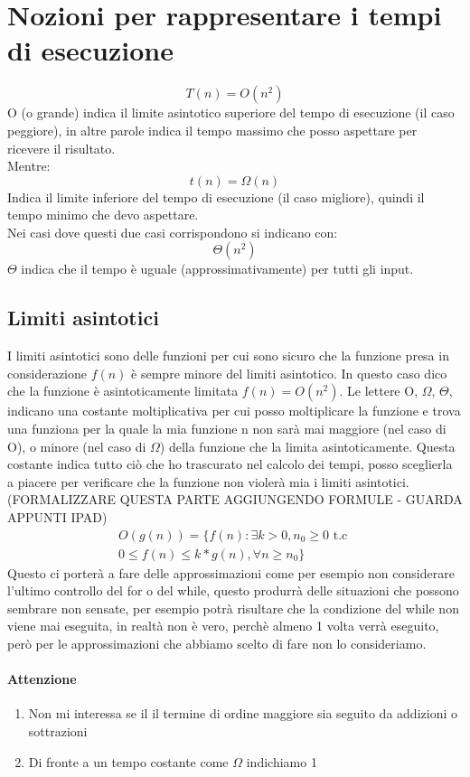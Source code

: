 \section{Nozioni per rappresentare i tempi di esecuzione}
\begin{equation*}
    T(n) = O(n^2)
\end{equation*}
O (o grande) indica il limite asintotico superiore del tempo di esecuzione (il caso peggiore),
in altre parole indica il tempo massimo che posso aspettare per ricevere il risultato.\\
Mentre:
\begin{equation*}
    t(n) = \Omega(n)
\end{equation*}
Indica il limite inferiore del tempo di esecuzione (il caso migliore), quindi il tempo
minimo che devo aspettare.\\
Nei casi dove questi due casi corrispondono si indicano con:
\begin{equation*}
    \Theta(n^2)
\end{equation*}
$\Theta$ indica che il tempo è uguale (approssimativamente) per tutti gli input.
\subsection{Limiti asintotici}
I limiti asintotici sono delle funzioni per cui sono sicuro che la funzione presa in
considerazione $f(n)$ è sempre minore del limiti asintotico. In questo caso
dico che la funzione è asintoticamente limitata $f(n) = O(n^2)$.
Le lettere O, $\Omega$, $\Theta$, indicano una costante moltiplicativa per cui posso
moltiplicare la funzione e trova una funziona per la quale la mia funzione n non sarà
mai maggiore (nel caso di O), o minore (nel caso di $\Omega$) della funzione che la limita
asintoticamente. Questa costante indica tutto ciò che ho trascurato nel calcolo dei tempi, 
posso sceglierla a piacere per verificare che la funzione non violerà mia i limiti
asintotici. (FORMALIZZARE QUESTA PARTE AGGIUNGENDO FORMULE - GUARDA APPUNTI IPAD)
\begin{align*}
    O(g(n)) = \{f(n):\exists k>0, n_0 \geq 0 \,\, \text{t.c}\,\, \\
    0 \leq f(n) \leq k*g(n), \forall n \geq n_0 \}
\end{align*}
Questo ci porterà a fare delle approssimazioni come per esempio non considerare
l'ultimo controllo del for o del while, questo produrrà delle situazioni che possono
sembrare non sensate, per esempio potrà risultare che la condizione del while non viene mai
eseguita, in realtà non è vero, perchè almeno 1 volta verrà eseguito, però per le approssimazioni
che abbiamo scelto di fare non lo consideriamo.
\paragraph*{Attenzione}
\begin{enumerate}
    \item Non mi interessa se il il termine di ordine maggiore sia seguito da addizioni o sottrazioni
    \item Di fronte a un tempo costante come $\Omega$ indichiamo 1
\end{enumerate}